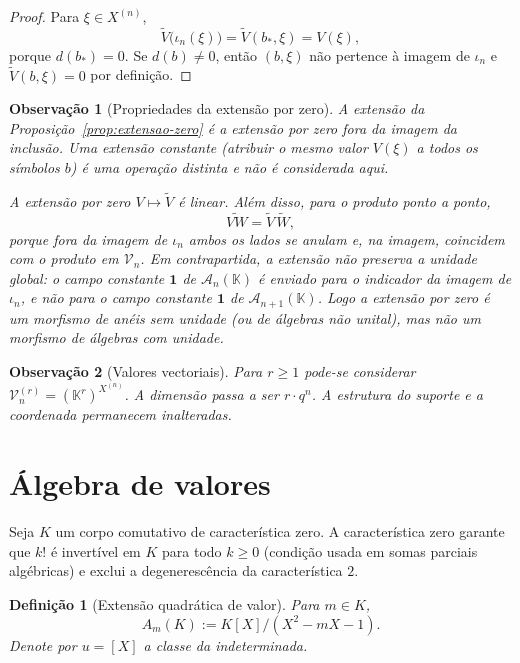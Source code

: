 \documentclass[11pt,a4paper]{article}
\newtheorem{definicao}{Definição}
\newtheorem{observacao}{Observação}
\begin{document}
\begin{proof}
Para \(\xi\in X^{(n)}\),
\[
\widetilde V\bigl(\iota_n(\xi)\bigr)
= \widetilde V(b_*,\xi)
= V(\xi),
\]
porque \(d(b_*)=0\).
Se \(d(b)\neq 0\), então \((b,\xi)\) não pertence à imagem de \(\iota_n\) e
\(\widetilde V(b,\xi)=0\) por definição.
\end{proof}

\begin{observacao}[Propriedades da extensão por zero]
\label{obs:distincao-extensoes}
A extensão da Proposição~\ref{prop:extensao-zero} é a \emph{extensão por zero}
fora da imagem da inclusão.
Uma \emph{extensão constante} (atribuir o mesmo valor \(V(\xi)\) a todos os
símbolos \(b\)) é uma operação distinta e não é considerada aqui.

A extensão por zero \(V\mapsto\widetilde V\) é linear.
Além disso, para o produto ponto a ponto,
\[
\widetilde{VW}=\widetilde V\,\widetilde W,
\]
porque fora da imagem de \(\iota_n\) ambos os lados se anulam e, na imagem,
coincidem com o produto em \(\mathcal V_n\).
Em contrapartida, a extensão \emph{não} preserva a unidade global: o campo
constante \(\mathbf 1\) de \(\mathcal A_n(\mathbb K)\) é enviado para o
indicador da imagem de \(\iota_n\), e não para o campo constante
\(\mathbf 1\) de \(\mathcal A_{n+1}(\mathbb K)\).
Logo a extensão por zero é um morfismo de anéis sem unidade (ou de álgebras
não unital), mas não um morfismo de álgebras com unidade.
\end{observacao}

\begin{observacao}[Valores vectoriais]
\label{obs:valores-vectoriais}
Para \(r\ge 1\) pode-se considerar \(\mathcal V_n^{(r)}=(\mathbb K^r)^{X^{(n)}}\).
A dimensão passa a ser \(r\cdot q^n\).
A estrutura do suporte e a coordenada permanecem inalteradas.
\end{observacao}

\section{Álgebra de valores}
\label{sec:valores}

Seja \(K\) um corpo comutativo de característica zero.
A característica zero garante que \(k!\) é invertível em \(K\) para todo
\(k\ge 0\) (condição usada em somas parciais algébricas) e exclui a
degenerescência da característica \(2\).

\begin{definicao}[Extensão quadrática de valor]
\label{def:AmK}
Para \(m\in K\),
\[
A_m(K) := K[X]/(X^2-mX-1).
\]
Denote por \(u=[X]\) a classe da indeterminada.
\end{definicao}
\end{document}
